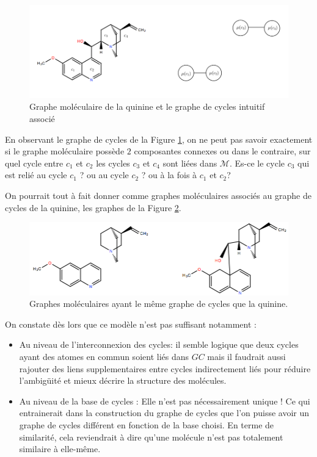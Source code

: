 \begin{figure}[H]
\label{grapheintuitif}

\begin{center}
\includegraphics[scale=0.45]{exemple_intuitif_correct.png}
\end{center}
\caption{Graphe moléculaire de la quinine et le graphe de cycles intuitif associé}
\end{figure}

En observant le graphe de cycles de la Figure \ref{grapheintuitif}, on ne peut pas savoir exactement si le graphe moléculaire possède $2$ composantes connexes ou dans le contraire, sur quel cycle entre $c_1$ et $c_2$ les cycles $c_3$ et $c_4$ sont liées dans $\mathcal{M}$. Es-ce le cycle $c_3$ qui est relié au cycle $c_1$ ? ou au cycle $c_2$ ? ou à la fois à $c_1$ et $c_2$?

On pourrait tout à fait donner comme graphes moléculaires associés au graphe de cycles de la quinine, les graphes de la Figure \ref{exempleintuitif}.

\begin{figure}[H]
\label{exempleintuitif}

\begin{center}
\includegraphics[scale=0.45]{exemple_graphes.png}
\end{center}
\caption{Graphes moléculaires ayant le même graphe de cycles que la quinine.}
\end{figure}

On constate dès lors que ce modèle n'est pas suffisant notamment :
\begin{itemize}
\item Au niveau de l'interconnexion des cycles: il semble logique que deux cycles ayant des atomes en commun soient liés dans $GC$ mais il faudrait aussi rajouter des liens supplementaires entre cycles indirectement liés pour réduire l'ambigüité et mieux décrire la structure des molécules.

\item Au niveau de la base de cycles : Elle n'est pas nécessairement unique ! Ce qui entrainerait dans la construction du graphe de cycles que l'on puisse avoir un graphe de cycles différent en fonction de la base choisi. En terme de similarité, cela reviendrait à dire qu'une molécule n'est pas totalement similaire à elle-même.
\end{itemize} 

